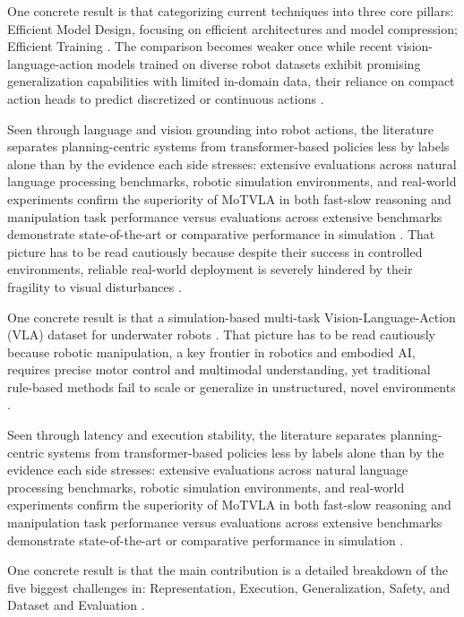 \documentclass[a4paper,11pt]{article}
\begin{document}
One concrete result is that categorizing current techniques into three core pillars: Efficient Model Design, focusing on efficient architectures and model compression; Efficient Training \citep{Yu2025Survey}. The comparison becomes weaker once while recent vision-language-action models trained on diverse robot datasets exhibit promising generalization capabilities with limited in-domain data, their reliance on compact action heads to predict discretized or continuous actions \citep{Hou2025Dita}.

Seen through language and vision grounding into robot actions, the literature separates planning-centric systems from transformer-based policies less by labels alone than by the evidence each side stresses: extensive evaluations across natural language processing benchmarks, robotic simulation environments, and real-world experiments confirm the superiority of MoTVLA in both fast-slow reasoning and manipulation task performance versus evaluations across extensive benchmarks demonstrate state-of-the-art or comparative performance in simulation \citep{Huang2025Motvla,Zheng2025Soft,Hou2025Dita}. That picture has to be read cautiously because despite their success in controlled environments, reliable real-world deployment is severely hindered by their fragility to visual disturbances \citep{Orjuela2026Improving}.

One concrete result is that a simulation-based multi-task Vision-Language-Action (VLA) dataset for underwater robots \citep{Gu2025Usim}. That picture has to be read cautiously because robotic manipulation, a key frontier in robotics and embodied AI, requires precise motor control and multimodal understanding, yet traditional rule-based methods fail to scale or generalize in unstructured, novel environments \citep{Shao2025Large}.

Seen through latency and execution stability, the literature separates planning-centric systems from transformer-based policies less by labels alone than by the evidence each side stresses: extensive evaluations across natural language processing benchmarks, robotic simulation environments, and real-world experiments confirm the superiority of MoTVLA in both fast-slow reasoning and manipulation task performance versus evaluations across extensive benchmarks demonstrate state-of-the-art or comparative performance in simulation \citep{Huang2025Motvla,Zheng2025Soft,Hou2025Dita}.

One concrete result is that the main contribution is a detailed breakdown of the five biggest challenges in: Representation, Execution, Generalization, Safety, and Dataset and Evaluation \citep{Xu2025Anatomy}.
\end{document}

